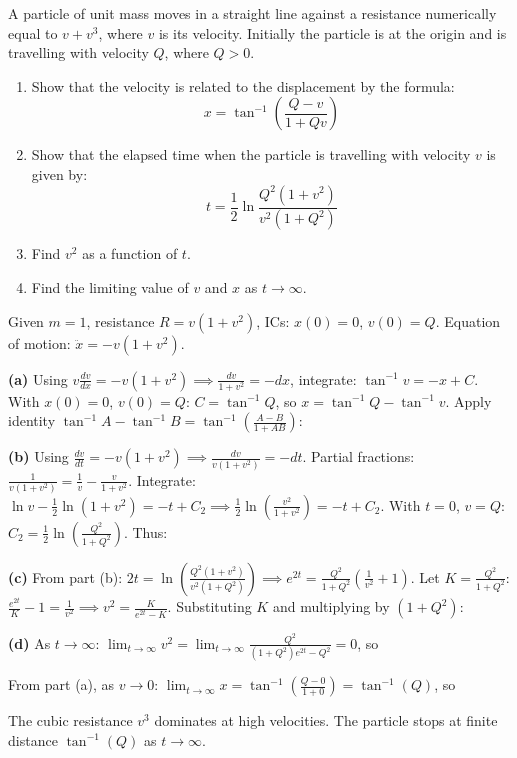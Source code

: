 \newpage

\begin{problem}
A particle of unit mass moves in a straight line against a resistance numerically equal to $v+v^3$, where $v$ is its velocity. Initially the particle is at the origin and is travelling with velocity $Q$, where $Q > 0$.

\begin{enumerate}[label=(\alph*)]
    \item Show that the velocity is related to the displacement by the formula:
    \[ x = \tan^{-1}\left(\frac{Q-v}{1+Qv}\right) \]
    \item Show that the elapsed time when the particle is travelling with velocity $v$ is given by:
    \[ t = \frac{1}{2} \ln \frac{Q^2(1+v^2)}{v^2(1+Q^2)} \]
    \item Find $v^2$ as a function of $t$.
    \item Find the limiting value of $v$ and $x$ as $t \to \infty$.
\end{enumerate}
\end{problem}

\begin{solution}
Given $m=1$, resistance $R = v(1+v^2)$, ICs: $x(0)=0$, $v(0)=Q$. Equation of motion: $\ddot{x} = -v(1+v^2)$.

\textbf{(a)} Using $v\frac{dv}{dx} = -v(1+v^2) \implies \frac{dv}{1+v^2} = -dx$, integrate: $\tan^{-1}v = -x + C$. With $x(0)=0$, $v(0)=Q$: $C = \tan^{-1}Q$, so $x = \tan^{-1}Q - \tan^{-1}v$. Apply identity $\tan^{-1}A - \tan^{-1}B = \tan^{-1}\left(\frac{A-B}{1+AB}\right)$:

 \quad {}

\textbf{(b)} Using $\frac{dv}{dt} = -v(1+v^2) \implies \frac{dv}{v(1+v^2)} = -dt$. Partial fractions: $\frac{1}{v(1+v^2)} = \frac{1}{v} - \frac{v}{1+v^2}$. Integrate: $\ln v - \frac{1}{2}\ln(1+v^2) = -t + C_2 \implies \frac{1}{2}\ln\left(\frac{v^2}{1+v^2}\right) = -t + C_2$. With $t=0$, $v=Q$: $C_2 = \frac{1}{2}\ln\left(\frac{Q^2}{1+Q^2}\right)$. Thus:

 \quad {}

\textbf{(c)} From part (b): $2t = \ln\left(\frac{Q^2(1+v^2)}{v^2(1+Q^2)}\right) \implies e^{2t} = \frac{Q^2}{1+Q^2}\left(\frac{1}{v^2}+1\right)$. Let $K=\frac{Q^2}{1+Q^2}$: $\frac{e^{2t}}{K}-1 = \frac{1}{v^2} \implies v^2 = \frac{K}{e^{2t}-K}$. Substituting $K$ and multiplying by $(1+Q^2)$:


\textbf{(d)} As $t \to \infty$: $\lim_{t\to\infty} v^2 = \lim_{t\to\infty}\frac{Q^2}{(1+Q^2)e^{2t}-Q^2} = 0$, so 

From part (a), as $v \to 0$: $\lim_{t\to\infty} x = \tan^{-1}\left(\frac{Q-0}{1+0}\right) = \tan^{-1}(Q)$, so 

The cubic resistance $v^3$ dominates at high velocities. The particle stops at finite distance $\tan^{-1}(Q)$ as $t \to \infty$.
\end{solution}

